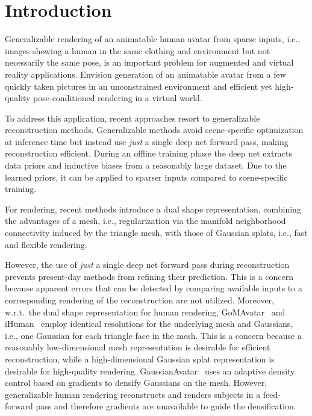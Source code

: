 \section{Introduction}
\label{sec:intro}
Generalizable rendering of an animatable human avatar from sparse inputs, i.e., images showing a human in the same clothing and environment but not necessarily the same pose, is an important problem for augmented and virtual reality applications. Envision generation of an animatable avatar from a few quickly taken pictures in an unconstrained environment and efficient yet high-quality pose-conditioned rendering in a virtual world.

To address this application, recent approaches  \citep{kwon2024ghg, zheng2024gpsgaussian, li2024ghunerf, hu2023sherf, pan2023transhuman} resort to generalizable reconstruction methods. Generalizable methods avoid scene-specific optimization at inference time but instead use \textit{just} a single deep net forward pass, making reconstruction efficient. During an offline training phase the deep net extracts data priors and inductive biases from a reasonably large dataset. Due to the learned priors, it can be applied to sparser inputs compared to scene-specific training.

For rendering, recent methods  \citep{wen2024gomavatar, paudel2024ihuman, guedon2024sugar} introduce a dual shape representation, combining the advantages of a mesh, i.e., regularization via the manifold neighborhood connectivity induced by the triangle mesh, with those of Gaussian splats, i.e., fast and flexible rendering.

However, the use of \textit{just} a single deep net forward pass during reconstruction prevents present-day methods from refining their prediction. This is a concern because apparent errors that can be detected by comparing available inputs to a corresponding rendering of the reconstruction are not utilized. 
Moreover, w.r.t.\ the dual shape representation for human rendering, GoMAvatar~\citep{wen2024gomavatar} and iHuman~\citep{paudel2024ihuman} employ identical resolutions for the underlying mesh and Gaussians, i.e., one Gaussian for each triangle face in the mesh. This is a concern because a reasonably low-dimensional mesh representation is desirable for efficient reconstruction, while a high-dimensional Gaussian splat representation is desirable for high-quality rendering. GaussianAvatar~\citep{qian2023gaussianavatars} uses an adaptive density control based on gradients to densify Gaussians on the mesh. However, generalizable human rendering reconstructs and renders subjects in a feed-forward pass and therefore gradients are unavailable to guide the densification.


